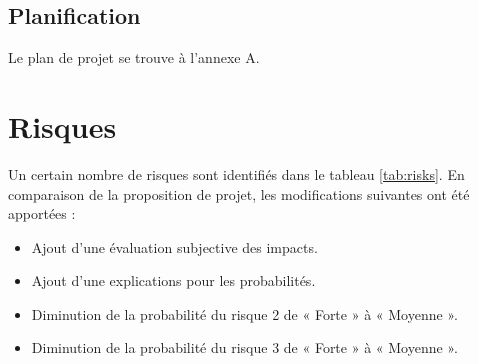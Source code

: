 \documentclass[a4paper, oneside, 12pt, titlepage]{article}
\begin{document}
\subsection{Planification}


Le plan de projet se trouve à l'annexe A.

\section{Risques}

%
%

Un certain nombre de risques sont identifiés dans le tableau \ref{tab:risks}. En comparaison de la
proposition de projet, les modifications suivantes ont été apportées :

\begin{itemize}
  \item Ajout d'une évaluation subjective des impacts.
  \item Ajout d'une explications pour les probabilités.
  \item Diminution de la probabilité du risque 2 de « Forte » à « Moyenne ».
  \item Diminution de la probabilité du risque 3 de « Forte » à « Moyenne ».
\end{itemize}
\end{document}
